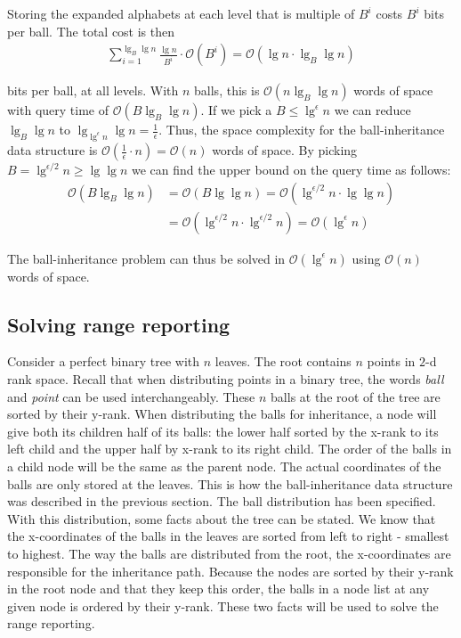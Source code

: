 Storing the expanded alphabets at each level that is multiple of $B^i$ costs $B^i$ bits per ball. The total cost is then 
\begin{align*}
  \sum\limits_{i=1}^{\lg_B \lg n} \frac{\lg n}{B^i} \cdot \mathcal{O}(B^i) = \mathcal{O}(\lg n \cdot \lg_B \lg n)
\end{align*}


\noindent bits per ball, at all levels. With $n$ balls, this is $\mathcal{O}(n \lg_B \lg n)$ words of space with query time of $\mathcal{O}(B \lg_B \lg n)$. If we pick a $B \leq \lg^\epsilon n$ we can reduce $\lg_B \lg n$ to $\lg_{\lg^\epsilon n} \lg n = \frac{1}{\epsilon}$. Thus, the space complexity for the ball-inheritance data structure is $\mathcal{O}(\frac{1}{\epsilon} \cdot n) = \mathcal{O}(n)$ words of space. By picking $B = \lg^{\epsilon / 2} n \geq \lg \lg n$ we can find the upper bound on  the query time as follows:
\begin{align*}
  \mathcal{O}(B \lg_B \lg n) &= \mathcal{O}(B \lg \lg n) = \mathcal{O}(\lg^{\epsilon /2} n \cdot \lg \lg n)\\
  &= \mathcal{O}(\lg^{\epsilon / 2} n \cdot \lg^{\epsilon / 2} n) = \mathcal{O}(\lg^\epsilon n)
\end{align*}

\noindent The ball-inheritance problem can thus be solved in $\mathcal{O}(\lg^\epsilon n)$ using $\mathcal{O}(n)$ words of space.

\subsection{Solving range reporting}

Consider a perfect binary tree with $n$ leaves. The root contains $n$ points in $2$-d rank space. Recall that when distributing points in a binary tree, the words \emph{ball} and \emph{point} can be used interchangeably. These $n$ balls at the root of the tree are sorted by their y-rank. When distributing the balls for inheritance, a node will give both its children half of its balls: the lower half sorted by the x-rank to its left child and the upper half by x-rank to its right child. The order of the balls in a child node will be the same as the parent node. The actual coordinates of the balls are only stored at the leaves. This is how the ball-inheritance data structure was described in the previous section. The ball distribution has been specified. With this distribution, some facts about the tree can be stated. We know that the x-coordinates of the balls in the leaves are sorted from left to right - smallest to highest. The way the balls are distributed from the root, the x-coordinates are responsible for the inheritance path.  Because the nodes are sorted by their y-rank in the root node and that they keep this order, the balls in a node list at any given node is ordered by their y-rank. These two facts will be used to solve the range reporting.

